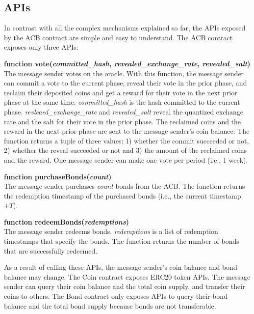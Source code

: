 \documentclass[dvipdfmx,a4paper]{article}
\begin{document}
\subsection{APIs}

In contrast with all the complex mechanisms explained so far, the APIs exposed by the ACB contract are simple and easy to understand. The ACB contract exposes only three APIs:

\begin{description}
\item{\textbf{function vote(\textit{committed\_hash}, \textit{revealed\_exchange\_rate}, \textit{revealed\_salt})}}\\
The message sender votes on the oracle. With this function, the message sender can commit a vote to the current phase, reveal their vote in the prior phase, and reclaim their deposited coins and get a reward for their vote in the next prior phase at the same time. \textit{committed\_hash} is the hash committed to the current phase. \textit{revleaed\_exchange\_rate} and \textit{revealed\_salt} reveal the quantized exchange rate and the salt for their vote in the prior phase. The reclaimed coins and the reward in the next prior phase are sent to the message sender's coin balance. The function returns a tuple of three values: 1) whether the commit succeeded or not, 2) whether the reveal succeeded or not and 3) the amount of the reclaimed coins and the reward. One message sender can make one vote per period (i.e., 1 week).
\item{\textbf{function purchaseBonds(\textit{count})}}\\
The message sender purchases \textit{count} bonds from the ACB. The function returns the redemption timestamp of the purchased bonds (i.e., the current timestamp $+T$).
\item{\textbf{function redeemBonds(\textit{redemptions})}}\\
The message sender redeems bonds. \textit{redemptions} is a list of redemption timestamps that specify the bonds. The function returns the number of bonds that are successfully redeemed.
\end{description}

As a result of calling these APIs, the message sender's coin balance and bond balance may change. The Coin contract exposes ERC20 token APIs. The message sender can query their coin balance and the total coin supply, and transfer their coins to others. The Bond contract only exposes APIs to query their bond balance and the total bond supply because bonds are not transferable.
\end{document}
